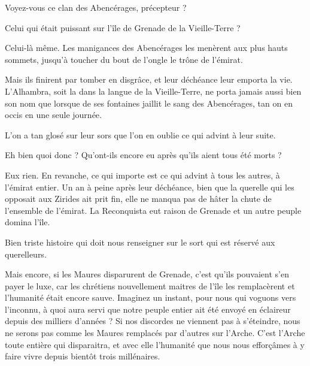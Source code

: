 \begin{drama}

  \elenaspeaks Voyez-vous ce clan des Abencérages, précepteur ?

  \alexasspeaks Celui qui était puissant sur l’île de Grenade de la Vieille-Terre ?

  \elenaspeaks Celui-là même. Les manigances des Abencérages les menèrent aux plus hauts sommets, jusqu’à toucher du bout de l’ongle le trône de l’émirat.

  \alexasspeaks Mais ils finirent par tomber en disgrâce, et leur déchéance leur emporta la vie. L’Alhambra, soit la  dans la langue de la Vieille-Terre, ne porta jamais aussi bien son nom que lorsque de ses fontaines jaillit le sang des Abencérages, tan on en occis en une seule journée.

  \elenaspeaks L’on a tan glosé sur leur sors que l’on en oublie ce qui advint à leur suite.

  \alexasspeaks Eh bien quoi donc ? Qu’ont-ils encore eu après qu’ils aient tous été morts ?

  \elenaspeaks Eux rien. En revanche, ce qui importe est ce qui advint à tous les autres, à l’émirat entier. Un an à peine après leur déchéance, bien que la querelle qui les opposait aux Zirides ait prit fin, elle ne manqua pas de hâter la chute de l’ensemble de l’émirat. La Reconquista eut raison de Grenade et un autre peuple domina l’île.

  \alexasspeaks Bien triste histoire qui doit nous renseigner sur le sort qui est réservé aux querelleurs.

  \elenaspeaks Mais encore, si les Maures disparurent de Grenade, c’est qu’ils pouvaient s’en payer le luxe, car les chrétiens nouvellement maitres de l’île les remplacèrent et l’humanité était encore sauve. Imaginez un instant, pour nous qui voguons vers l’inconnu, à quoi aura servi que notre peuple entier ait été envoyé en éclaireur depuis des milliers d’années ? Si nos discordes ne viennent pas à s’éteindre, nous ne serons pas comme les Maures remplacés par d’autres sur l’Arche. C’est l’Arche toute entière qui disparaitra, et avec elle l’humanité que nous nous efforçâmes à y faire vivre depuis bientôt trois millénaires.



\end{drama}

